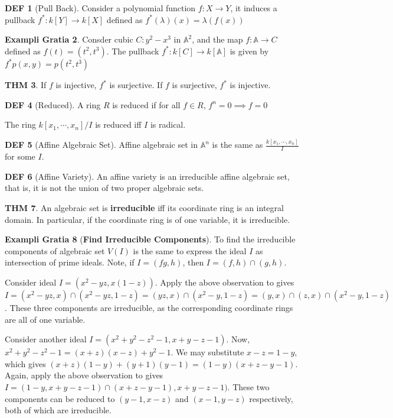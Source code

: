 \documentclass[twocolumn]{article}
\renewcommand{\emph}[1]{{\color{blue!70!black}\sffamily\bfseries #1}}
\newcommand{\A}{\mathbb{A}}
\theoremstyle{definition}
\newtheorem{thm}{THM}
\newtheorem{example}[thm]{Exampli Gratia}
\newtheorem{defi}[thm]{DEF}
\theoremstyle{remark}
\begin{document}
\begin{defi}[Pull Back]
	Consider a polynomial function $f: X \rightarrow Y$, it induces a pullback $f^*: k[Y] \rightarrow k[X]$ defined as $f^*(\lambda)(x) = \lambda(f(x))$
\end{defi}

\begin{example}
	Consder cubic $C:y^2 - x^3$ in $\A^2$, and the map $f:\A \rightarrow C$ defined as $f(t) = (t^2, t^3)$.
	The pullback $f^*: k[C] \rightarrow k[\A]$ is given by
	$f^*{p(x,y)} = p(t^2, t^3)$
\end{example}

\begin{thm}
	If $f$ is injective, $f^*$ is surjective. 
	If $f$ is surjective, $f^*$ is injective.
\end{thm}

\begin{defi}[Reduced]
	A ring $R$ is reduced if for all $f \in R$, $f^n = 0 \implies f= 0$

	The ring $k[x_1, \cdots, x_n]/I$ is reduced iff $I$ is radical.
\end{defi}

\begin{defi}[Affine Algebraic Set]
	Affine algebraic set in $\A^n$ is the same as $\frac{k[x_1, \cdots, x_n]}{I}$ for some $I$.
\end{defi}

\begin{defi}[Affine Variety]
	An affine variety is an irreducible affine algebraic set, that is, it is not the union of two proper algebraic sets.
\end{defi}

\begin{thm}
	An algebraic set is \emph{irreducible} iff its coordinate ring is an integral domain. 
	In particular, if the coordinate ring is of one variable, it is irreducible.
\end{thm}

\begin{example}[\emph{Find Irreducible Components}]
	To find the irreducible components of algebraic set $V(I)$ is the same to express the ideal $I$ as intersection of prime ideals. 	
	Note, if $I = (fg, h)$, then $I = (f, h) \cap (g, h)$.
	
	Consider ideal $I = (x^2 - yz, x(1-z))$. 
	Apply the above observation to gives $I =(x^2-yz, x) \cap (x^2 - yz, 1-z) = (yz, x) \cap (x^2-y, 1-z) = (y, x) \cap (z, x) \cap (x^2 -y, 1-z)$.
	These three components are irreducible, as the corresponding coordinate rings are all of one variable.

	Consider another ideal $I = (x^2 + y^2 - z^2 -1, x+y-z-1)$. 
	Now, $x^2 + y^2 - z^2 - 1 = (x+z)(x-z) + y^2 - 1$.
	We may substitute $x -z =1 - y$, which gives $(x+z)(1 - y)+ (y+1)(y - 1) = (1 - y) ( x+z - y- 1)$. 
	Again, apply the above observation to gives $I = (1- y, x+y-z-1) \cap (x + z - y - 1), x + y - z - 1).$
	These two components can be reduced to $(y-1, x -z)$ and $(x-1, y-z)$ respectively, both of which are irreducible.
\end{example}
\end{document}
